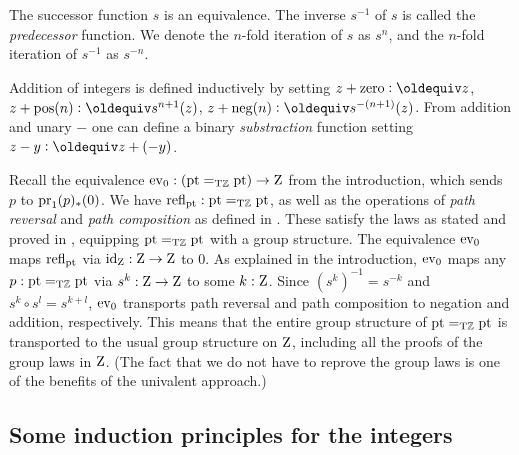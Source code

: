 \documentclass[a4paper,12pt]{amsart}
\begin{document}
The successor function $s$ is an equivalence.
The inverse $s^{-1}$ of $s$ is called the \emph{predecessor} function.
We denote the $n$-fold iteration of $s$ as $s^n$, and
the $n$-fold iteration of $s^{-1}$ as $s^{-n}$.

Addition of integers is defined inductively by setting
$z + \zzero\defeq z$,
$z + \zpos(n)\defeq s^{n+1}(z)$,
$z + \zneg(n)\defeq s^{-(n+1)}(z)$.
From addition and unary $-$ one can define a binary
\emph{substraction} function setting $z-y \defeq z+(-y)$.


Recall the equivalence $\mathrm{ev}_0 : ({\mathord{\mathrm{pt}}}=_{\mathrm{T}\mathbb{Z}} {\mathord{\mathrm{pt}}})\to\mathrm{Z}$ from the introduction,
{which sends $p$ to $\operatorname{pr}_1(p)_*(0)$}.
We have $\mathop{{\mathrm{refl}}_{{\mathord{\mathrm{pt}}}}} : {\mathord{\mathrm{pt}}}=_{\mathrm{T}\mathbb{Z}} {\mathord{\mathrm{pt}}}$, as well as the operations
of \emph{path reversal} and \emph{path composition} as defined
in \cite[2.1]{hottbook}. These satisfy the laws as stated
and proved in \cite[Lemma 2.1.4]{hottbook}, equipping ${\mathord{\mathrm{pt}}}=_{\mathrm{T}\mathbb{Z}} {\mathord{\mathrm{pt}}}$
with a group structure.
The equivalence $\mathrm{ev}_0$ maps $\mathop{{\mathrm{refl}}_{{\mathord{\mathrm{pt}}}}}$ via $\mathord{\mathrm{id}}_{\mathrm{Z}} : \mathrm{Z}\to\mathrm{Z}$ to $0$.
As explained in the introduction, $\mathrm{ev}_0$ maps any $p : {\mathord{\mathrm{pt}}}=_{\mathrm{T}\mathbb{Z}} {\mathord{\mathrm{pt}}}$
via $s^k : \mathrm{Z}\to\mathrm{Z}$ to some $k:\mathrm{Z}$. Since $(s^k)^{-1} = s^{-k}$
and $s^k \circ s^l = s^{k+l}$, $\mathrm{ev}_0$ transports path reversal
and path composition to negation and addition, respectively.
This means that the entire group structure of ${\mathord{\mathrm{pt}}}=_{\mathrm{T}\mathbb{Z}} {\mathord{\mathrm{pt}}}$
is transported to the usual group structure on $\mathrm{Z}$,
including all the proofs of the group laws in $\mathrm{Z}$.
(The fact that we do not have to reprove the group laws
is one of the benefits of the univalent approach.)


\subsection{Some induction principles for the integers}
\label{sec:integers-induction}
\end{document}
